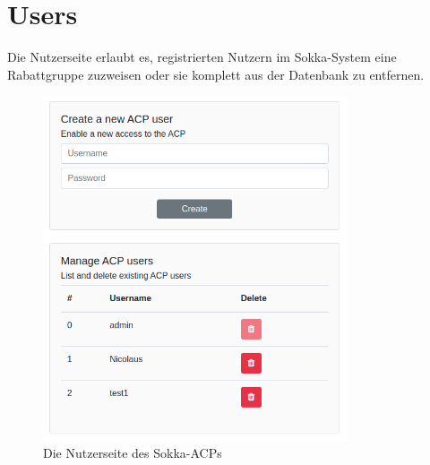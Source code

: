 \section{Users}

Die Nutzerseite erlaubt es, registrierten Nutzern im Sokka-System eine Rabattgruppe zuzweisen oder sie komplett aus der Datenbank zu entfernen.

\begin{figure}[ht]
    \centering
    \includegraphics[width=0.8\textwidth]{images/ACP/users.png}
    \caption{Die Nutzerseite des Sokka-ACPs}
\end{figure}
